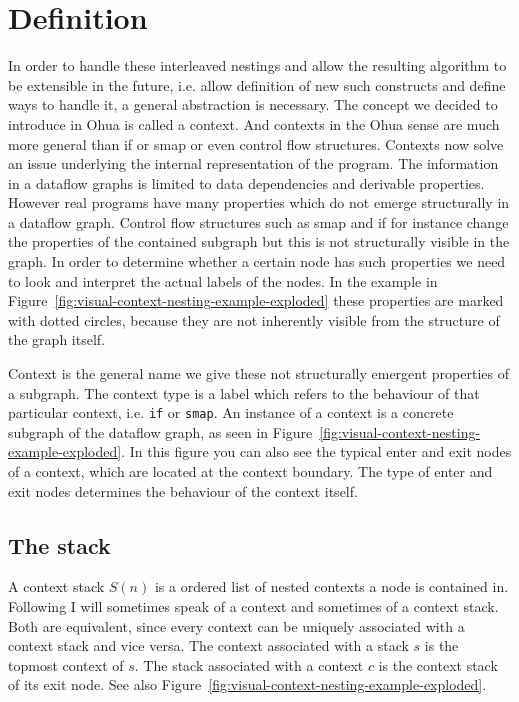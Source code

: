 \section{Definition}

In order to handle these interleaved nestings and allow the resulting algorithm to be extensible in the future, i.e. allow definition of new such constructs and define ways to handle it, a general abstraction is necessary.
The concept we decided to introduce in Ohua is called a context.
And contexts in the Ohua sense are much more general than if or smap or even control flow structures.
Contexts now solve an issue underlying the internal representation of the program.
The information in a dataflow graphs is limited to data dependencies and derivable properties.
However real programs have many properties which do not emerge structurally in a dataflow graph.
Control flow structures such as smap and if for instance change the properties of the contained subgraph but this is not structurally visible in the graph.
In order to determine whether a certain node has such properties we need to look and interpret the actual labels of the nodes.
In the example in Figure~\ref{fig:visual-context-nesting-example-exploded} these properties are marked with dotted circles, because they are not inherently visible from the structure of the graph itself.

Context is the general name we give these not structurally emergent properties of a subgraph.
The context type is a label which refers to the behaviour of that particular context, i.e. \texttt{if} or \texttt{smap}.
An instance of a context is a concrete subgraph of the dataflow graph, as seen in Figure~\ref{fig:visual-context-nesting-example-exploded}.
In this figure you can also see the typical enter and exit nodes of a context, which are located at the context boundary.
The type of enter and exit nodes determines the behaviour of the context itself.

\subsection{The stack}

A context stack $S(n)$ is a ordered list of nested contexts a node is contained in.
Following I will sometimes speak of a context and sometimes of a context stack.
Both are equivalent, since every context can be uniquely associated with a context stack and vice versa.
The context associated with a stack $s$ is the topmost context of $s$.
The stack associated with a context $c$ is the context stack of its exit node.
See also Figure~\ref{fig:visual-context-nesting-example-exploded}.


